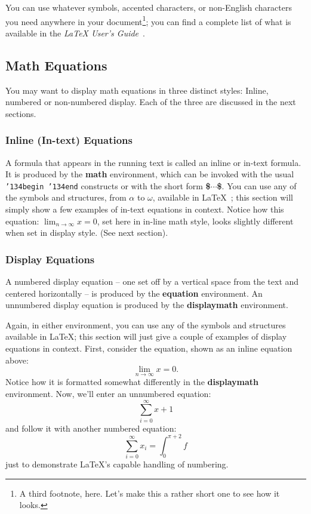 \documentclass[article,english]{stucosrec}
\newcommand{\latex}{\LaTeX\xspace}
\begin{document}
	You can use whatever symbols, accented characters, or non-English characters you need anywhere in your document\footnote{A third footnote, here. Let's make this a rather short one to see how it looks.}; you can find a complete list of what is available in the \textit{\latex
	User's Guide}~\cite{Lamport:LaTeX}.
	
	\subsection{Math Equations}
	
	You may want to display math equations in three distinct styles: Inline, numbered or non-numbered display.
	Each of the three are discussed in the next sections.
	
	\subsubsection{Inline (In-text) Equations}
	
	A formula that appears in the running text is called an inline or in-text formula.
	It is produced by the \textbf{math} environment, which can be invoked with the usual \texttt{{\char'134}begin {\char'134}end} constructs or with the short form \textbf{\$$\cdots$\$}.
	You can use any of the symbols and structures, from $\alpha$ to $\omega$, available in \latex~\cite{Lamport:LaTeX}; this section will simply show a few examples of in-text equations in context.
	Notice how this equation: 
	\begin{math}\lim_{n\rightarrow \infty}x=0\end{math}, 
	set here in in-line math style, looks slightly different when set in display style.
	(See next section).
	
	\subsubsection{Display Equations}
	
	A numbered display equation -- one set off by a vertical space from the text and centered horizontally -- is produced by the \textbf{equation} environment.
	An unnumbered display equation is produced by the \textbf{displaymath} environment.
	
	Again, in either environment, you can use any of the symbols and structures available in \latex; this section will just give a couple of examples of display equations in context.
	First, consider the equation, shown as an inline equation above:
	\begin{equation}\lim_{n\rightarrow \infty}x=0.\end{equation}
	Notice how it is formatted somewhat differently in the \textbf{displaymath} environment.
	Now, we'll enter an unnumbered equation:
	\begin{displaymath}\sum_{i=0}^{\infty} x + 1\end{displaymath}
	and follow it with another numbered equation:
	\begin{equation}\sum_{i=0}^{\infty}x_i=\int_{0}^{\pi+2} f\end{equation}
	just to demonstrate \latex's capable handling of numbering.
	
\end{document}
